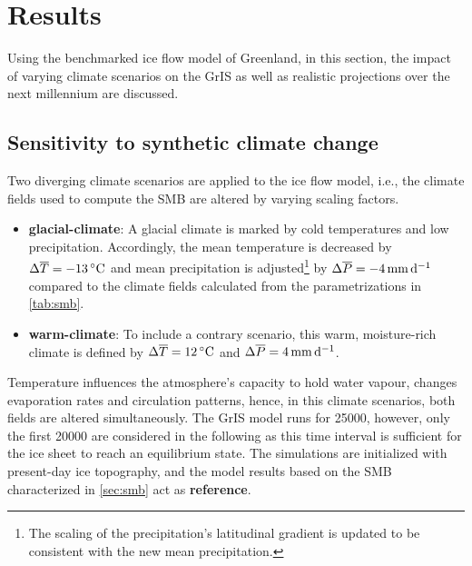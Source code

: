 \section{Results}

Using the benchmarked ice flow model of Greenland, in this section, the impact of varying climate scenarios on the GrIS as well as realistic projections over the next millennium are discussed. 

\subsection{Sensitivity to synthetic climate change}


Two diverging climate scenarios are applied to the ice flow model, i.e., the climate fields used to compute the SMB are altered by varying scaling factors.

\begin{itemize}
	\item \textbf{glacial-climate}: A glacial climate is marked by cold temperatures and low precipitation. Accordingly, the mean temperature is decreased by \(\Delta\overline{T} = \SI{-13}{\celsius}\) and mean precipitation is adjusted\footnote{The scaling of the precipitation's latitudinal gradient is updated to be consistent with the new mean precipitation.} by \(\Delta\mean{P} = \SI{-4}{\mm\per\day}\) compared to the climate fields calculated from the parametrizations in \cref{tab:smb}.
	\item \textbf{warm-climate}: To include a contrary scenario, this warm, moisture-rich climate is defined by \(\Delta\overline{T} = \SI{+12}{\celsius}\) and \(\Delta\mean{P} = \SI{+4}{\mm\per\day}\).
\end{itemize}

Temperature influences the atmosphere's capacity to hold water vapour, changes evaporation rates and circulation patterns, hence, in this climate scenarios, both fields are altered simultaneously. The GrIS model runs for \SI{25000}{\year}, however, only the first \SI{20000}{\year} are considered in the following as this time interval is sufficient for the ice sheet to reach an equilibrium state. The simulations are initialized with present-day ice topography, and the model results based on the SMB characterized in \cref{sec:smb} act as \textbf{reference}.

